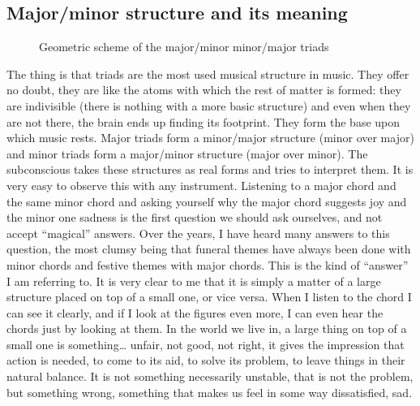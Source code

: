 \documentclass[]{report}
\begin{document}
\subsection{Major/minor structure and its meaning}
\begin{figure}[htbp]
	\center%
	\vspace{12pt}
	\caption{Geometric scheme of the major/minor minor/major triads}\label{fig:maj-minor-scheme}
\end{figure}
The thing is that triads are the most used musical structure in music. They offer no doubt, they are like the atoms with which the rest of matter is formed: they are indivisible (there is nothing with a more basic structure) and even when they are not there, the brain ends up finding its footprint. They form the base upon which music rests.
Major triads form a minor/major structure (minor over major) and minor triads form a major/minor structure (major over minor). The subconscious takes these structures as real forms and tries to interpret them.
It is very easy to observe this with any instrument. Listening to a major chord and the same minor chord and asking yourself why the major chord suggests joy and the minor one sadness is the first question we should ask ourselves, and not accept ``magical'' answers. Over the years, I have heard many answers to this question, the most clumsy being that funeral themes have always been done with minor chords and festive themes with major chords. This is the kind of ``answer'' I am referring to.
It is very clear to me that it is simply a matter of a large structure placed on top of a small one, or vice versa. When I listen to the chord I can see it clearly, and if I look at the figures even more, I can even hear the chords just by looking at them. In the world we live in, a large thing on top of a small one is something\ldots{} unfair, not good, not right, it gives the impression that action is needed, to come to its aid, to solve its problem, to leave things in their natural balance. It is not something necessarily unstable, that is not the problem, but something wrong, something that makes us feel in some way dissatisfied, sad.
\end{document}
